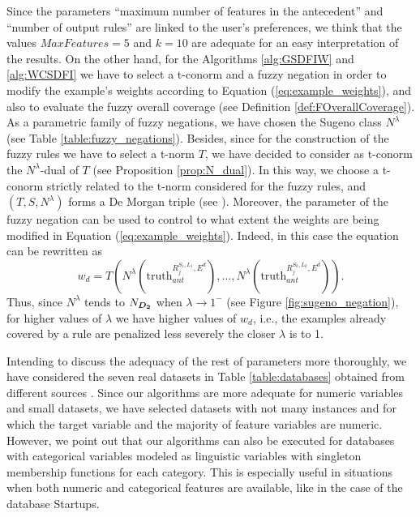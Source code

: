 Since the parameters ``maximum number of features in the antecedent'' and ``number of output rules'' are linked to the user's preferences, we think that the values $MaxFeatures=5$ and $k=10$ are adequate for an easy interpretation of the results. On the other hand, for the Algorithms \ref{alg:GSDFIW} and \ref{alg:WCSDFI} we have to select a t-conorm and a fuzzy negation in order to modify the example's weights according to Equation (\ref{eq:example_weights}), and also to evaluate the fuzzy overall coverage (see Definition \ref{def:FOverallCoverage}). As a parametric family of fuzzy negations, we have chosen the Sugeno class $N^{\lambda}$ (see Table \ref{table:fuzzy_negations}). Besides, since for the construction of the fuzzy rules we have to select a t-norm $T$, we have decided to consider as t-conorm the $N^{\lambda}$-dual of $T$ (see Proposition \ref{prop:N_dual}). In this way, we choose a t-conorm strictly related to the t-norm considered for the fuzzy rules, and $(T,S,N^{\lambda})$ forms a De Morgan triple (see \cite[Theorem 2.3.17]{Baczynski2008}). Moreover, the parameter of the fuzzy negation can be used to control to what extent the weights are being modified in Equation (\ref{eq:example_weights}). Indeed, in this case the equation can be rewritten as
\begin{equation}\label{eq:example_weights_concrete}
w_d = T(N^{\lambda}(\text{truth}_{ant}^{R^{S_1,L_1}_j,E^d}), \dots, N^{\lambda}(\text{truth}_{ant}^{R^{S_k,L_k}_j,E^d})).
\end{equation}
Thus, since $N^{\lambda}$ tends to $N_{\bm{D_2}}$ when $\lambda \to 1^-$ (see Figure \ref{fig:sugeno_negation}), for higher values of $\lambda$ we have higher values of $w_d$, i.e., the examples already covered by a rule are penalized less severely the closer $\lambda$ is to 1.

Intending to discuss the adequacy of the rest of parameters more thoroughly, we have considered the seven real datasets in Table \ref{table:databases} obtained from different sources \cite{AlcalFdez2011KEELDS,Dua2019}. Since our algorithms are more adequate for numeric variables and small datasets, we have selected datasets with not many instances and for which the target variable and the majority of feature variables are numeric. However, we point out that our algorithms can also be executed for databases with categorical variables modeled as linguistic variables with singleton membership functions for each category. This is especially useful in situations when both numeric and categorical features are available, like in the case of the database Startups.


